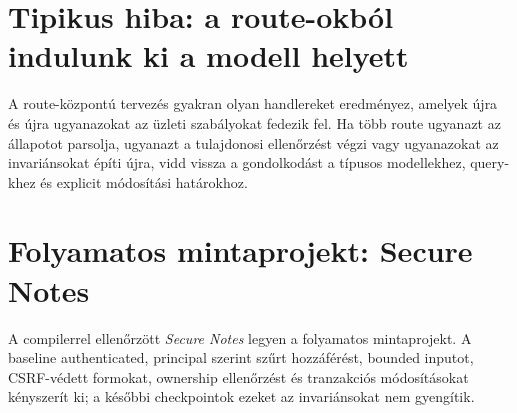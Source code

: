 \section{Tipikus hiba: a route-okból indulunk ki a modell helyett}
A route-központú tervezés gyakran olyan handlereket eredményez, amelyek újra és újra ugyanazokat az üzleti szabályokat fedezik fel. Ha több route ugyanazt az állapotot parsolja, ugyanazt a tulajdonosi ellenőrzést végzi vagy ugyanazokat az invariánsokat építi újra, vidd vissza a gondolkodást a típusos modellekhez, query-khez és explicit módosítási határokhoz.

\section{Folyamatos mintaprojekt: Secure Notes}
A compilerrel ellenőrzött  \emph{Secure Notes} legyen a folyamatos mintaprojekt. A baseline authenticated, principal szerint szűrt hozzáférést, bounded inputot, CSRF-védett formokat, ownership ellenőrzést és tranzakciós módosításokat kényszerít ki; a későbbi checkpointok ezeket az invariánsokat nem gyengítik.

